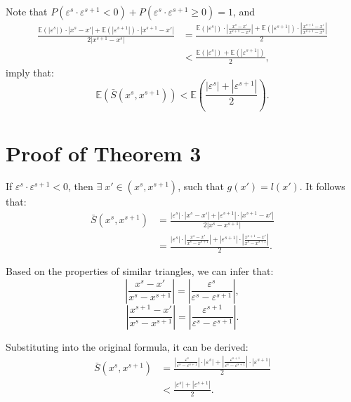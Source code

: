 \documentclass[final,3p,times]{elsarticle}
\begin{document}
Note that $P(\varepsilon^s\cdot\varepsilon^{s+1}<0)+
P(\varepsilon^s\cdot\varepsilon^{s+1}\ge0)=1$, and
\begin{equation*}
\begin{aligned}
\frac{{\mathbb{E}(|\varepsilon^s|)\cdot|x^s-x'|+
\mathbb{E}(|\varepsilon^{s+1}|)\cdot|x^{s+1}-x'|}}
{2|x^{s+1}-x^s|} 
&=\frac{{\mathbb{E}(|\varepsilon^s|)\cdot|\frac{x^s-x'}
{x^{s+1}-x^s}|+\mathbb{E}(|\varepsilon^{s+1}|)\cdot|
\frac{x^{s+1}-x'}{x^{s+1}-x^s}|}}{2}\\
&<\frac{{\mathbb{E}(|\varepsilon^s|)+\mathbb{E}(|
\varepsilon^{s+1}|)}}{2},
\end{aligned}
\end{equation*}
imply that:
\begin{equation*}
\mathbb{E}(\bar{S}(x^s,x^{s+1}))<\mathbb{E}(\frac{|
\varepsilon^s|+|\varepsilon^{s+1}|}{2}).
\end{equation*}

\section{Proof of Theorem 3}
If $\varepsilon^s\cdot\varepsilon^{s+1}<0$, then $\exists
\;x'\in(x^s,x^{s+1})$, such that $g(x')=l(x')$. It follows 
that:
\begin{equation*}
\begin{aligned}
\bar{S}(x^s,x^{s+1})
&=\frac{|\varepsilon^{s}|\cdot|x^{s}-x'|+|\varepsilon^
{s+1}|\cdot|x^{s+1}-x'|}{2|x^s-x^{s+1}|}\\
&=\frac{|\varepsilon^{s}|\cdot|\frac{x^s-x'}{x^{s}-x^
{s+1}}|+|\varepsilon^{s+1}|\cdot|\frac{x^{s+1}-x'}{x^{s}-
x^{s+1}}|}{2}.
\end{aligned}
\end{equation*}

Based on the properties of similar triangles, we can 
infer that:
\begin{equation*}
|\frac{x^s-x'}{x^{s}-x^{s+1}}|=|\frac{\varepsilon^s}
{\varepsilon^s-\varepsilon^{s+1}}|,
\end{equation*}
\begin{equation*}
|\frac{x^{s+1}-x'}{x^{s}-x^{s+1}}|=|\frac{\varepsilon^
{s+1}}{\varepsilon^s-\varepsilon^{s+1}}|.
\end{equation*}

Substituting into the original formula, it can be derived:
\begin{equation*}
\begin{aligned}
\bar{S}(x^s,x^{s+1})
&=\frac{|\frac{\varepsilon^s}{\varepsilon^s-\varepsilon^
{s+1}}|\cdot |\varepsilon^{s}|+|\frac{\varepsilon^{s+1}}
{\varepsilon^s-\varepsilon^{s+1}}|\cdot|\varepsilon^
{s+1}|}{2}\\
&<\frac{|\varepsilon^s|+|\varepsilon^{s+1}|}{2}.
\end{aligned}
\end{equation*}
\end{document}
